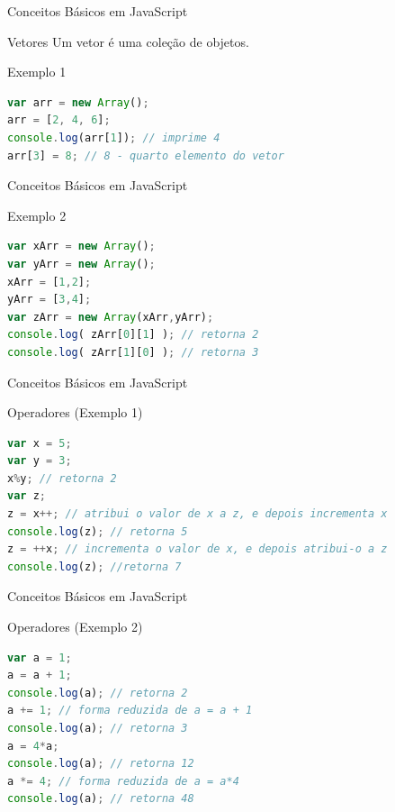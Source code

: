 \documentclass[xcolor=dvipsnames,table]{beamer}
\begin{document}
\begin{frame}[fragile]{Conceitos Básicos em JavaScript}
	\begin{block}{Vetores}
		Um vetor é uma coleção de objetos.	
	\end{block} \pause
	\begin{block}{Exemplo 1}
		\begin{lstlisting}[language=JavaScript]
var arr = new Array();
arr = [2, 4, 6];
console.log(arr[1]); // imprime 4
arr[3] = 8;	// 8 - quarto elemento do vetor
\end{lstlisting}	
	\end{block}
\end{frame}

\begin{frame}[fragile]{Conceitos Básicos em JavaScript}
	\begin{block}{Exemplo 2}
		\begin{lstlisting}[language=JavaScript]
var xArr = new Array();
var yArr = new Array();
xArr = [1,2];
yArr = [3,4];
var zArr = new Array(xArr,yArr);
console.log( zArr[0][1] ); // retorna 2
console.log( zArr[1][0] ); // retorna 3
\end{lstlisting}	
	\end{block}
\end{frame}

\begin{frame}[fragile]{Conceitos Básicos em JavaScript}
	\begin{block}{Operadores (Exemplo 1)}
		\begin{lstlisting}[language=JavaScript]
var x = 5;
var y = 3;
x%y; // retorna 2
var z;
z = x++; // atribui o valor de x a z, e depois incrementa x
console.log(z); // retorna 5
z = ++x; // incrementa o valor de x, e depois atribui-o a z
console.log(z); //retorna 7
\end{lstlisting}	
	\end{block}
\end{frame}

\begin{frame}[fragile]{Conceitos Básicos em JavaScript}
	\begin{block}{Operadores (Exemplo 2)}
		\begin{lstlisting}[language=JavaScript]
var a = 1;
a = a + 1;
console.log(a); // retorna 2
a += 1; // forma reduzida de a = a + 1
console.log(a); // retorna 3
a = 4*a;
console.log(a); // retorna 12
a *= 4; // forma reduzida de a = a*4
console.log(a); // retorna 48
\end{lstlisting}	
	\end{block}
\end{frame}
\end{document}
